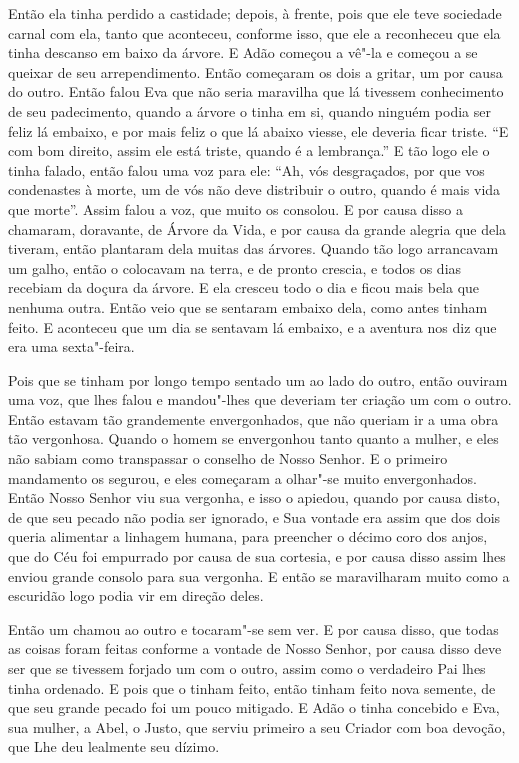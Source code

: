 Então ela tinha perdido a castidade; depois, à frente, pois que ele teve
sociedade carnal com ela, tanto que aconteceu, conforme isso, que ele a
reconheceu que ela tinha descanso em baixo da árvore. E Adão começou a vê"-la e
começou a se queixar de seu arrependimento. Então começaram os dois a gritar,
um por causa do outro. Então falou Eva que não seria maravilha que lá tivessem
conhecimento de seu padecimento, quando a árvore o tinha em si, quando ninguém
podia ser feliz lá embaixo, e por mais feliz o que lá abaixo viesse, ele
deveria ficar triste. “E com bom direito, assim ele está triste, quando é a
lembrança.” E tão logo ele o tinha falado, então falou uma voz para ele: ``Ah,
vós desgraçados, por que vos condenastes à morte, um de vós não deve distribuir
o outro, quando é mais vida que morte”. Assim falou a voz, que muito os
consolou. E por causa disso a chamaram, doravante, de Árvore da Vida, e por
causa da grande alegria que dela tiveram, então plantaram dela muitas das
árvores. Quando tão logo arrancavam um galho, então o colocavam na terra, e de
pronto crescia, e todos os dias recebiam da doçura da árvore. E ela cresceu
todo o dia e ficou mais bela que nenhuma outra. Então veio que se sentaram
embaixo dela, como antes tinham feito. E aconteceu que um dia se sentavam lá
embaixo, e a aventura nos diz que era uma sexta"-feira.

Pois que se tinham por longo tempo sentado um ao lado do outro, então ouviram
uma voz, que lhes falou e mandou"-lhes que deveriam ter criação um com o outro.
Então estavam tão grandemente envergonhados, que não queriam ir a uma obra tão
vergonhosa. Quando o homem se envergonhou tanto quanto a mulher, e eles não
sabiam como transpassar o conselho de Nosso Senhor. E o primeiro mandamento os
segurou, e eles começaram a olhar"-se muito envergonhados. Então Nosso Senhor
viu sua vergonha, e isso o apiedou, quando por causa disto, de que seu pecado
não podia ser ignorado, e Sua vontade era assim que dos dois queria alimentar a
linhagem humana, para preencher o décimo coro dos anjos, que do Céu foi
empurrado por causa de sua cortesia, e por causa disso assim lhes enviou grande
consolo para sua vergonha. E então se maravilharam muito como a escuridão logo
podia vir em direção deles. 

Então um chamou ao outro e tocaram"-se sem ver. E por causa disso, que todas as
coisas foram feitas conforme a vontade de Nosso Senhor, por causa disso deve
ser que se tivessem forjado um com o outro, assim como o verdadeiro Pai lhes
tinha ordenado. E pois que o tinham feito, então tinham feito nova semente, de
que seu grande pecado foi um pouco mitigado. E Adão o tinha concebido e Eva,
sua mulher, a Abel, o Justo, que serviu primeiro a seu Criador com boa devoção,
que Lhe deu lealmente seu dízimo.

